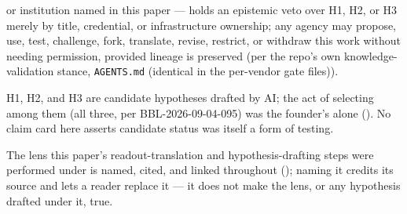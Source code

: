 \begin{disclaimers}
    or institution named in this paper --- holds an epistemic veto over H1,
    H2, or H3 merely by title, credential, or infrastructure ownership; any
    agency may propose, use, test, challenge, fork, translate, revise,
    restrict, or withdraw this work without needing permission, provided
    lineage is preserved (per the repo's own knowledge-validation stance,
    \texttt{AGENTS.md} (identical in the per-vendor gate files)).
  \item[D-CANDIDATE-STATUS] H1, H2, and H3 are candidate hypotheses drafted by
    AI; the act of selecting among them (all three, per BBL-2026-09-04-095)
    was the founder's alone (). No claim
    card here asserts candidate status was itself a form of testing.
  \item[D-EXTERNAL-INPUT] The lens this paper's readout-translation and
    hypothesis-drafting steps were performed under is named, cited, and
    linked throughout (); naming it credits its source and
    lets a reader replace it --- it does not make the lens, or any hypothesis
    drafted under it, true.
\end{disclaimers}
